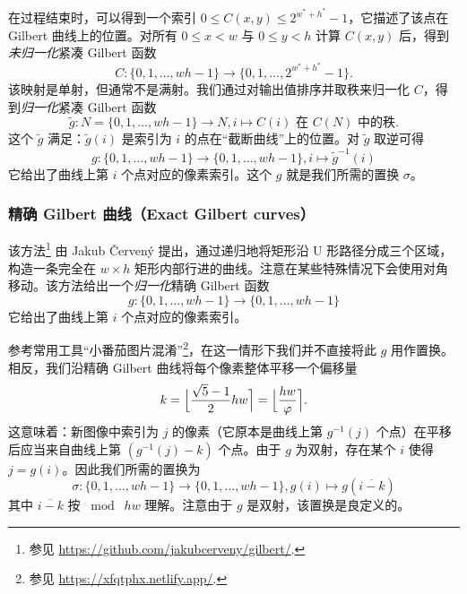 \documentclass[12pt, a4paper, twoside]{article}
\begin{document}
在过程结束时，可以得到一个索引 $0 \leq C(x, y) \leq 2^{w^* + h^*} - 1$，它描述了该点在 Gilbert 曲线上的位置。对所有 $0 \leq x < w$ 与 $0 \leq y < h$ 计算 $C(x,y)$ 后，得到\emph{未归一化}紧凑 Gilbert 函数
\begin{equation}
    C\colon \{0, 1, \ldots, w h - 1\} \to \{0, 1, \ldots, 2^{w^* + h^*} - 1\}.
\end{equation}
该映射是单射，但通常不是满射。我们通过对输出值排序并取秩来归一化 $C$，得到\emph{归一化}紧凑 Gilbert 函数
\begin{equation}
    \tilde{g}\colon N = \{0, 1, \ldots, w h - 1\} \to N, i \mapsto \text{$C(i)$ 在 $C(N)$ 中的秩}.
\end{equation}
这个 $\tilde{g}$ 满足：$\tilde{g}(i)$ 是索引为 $i$ 的点在“截断曲线”上的位置。对 $\tilde{g}$ 取逆可得
\begin{equation}
    g\colon \{0, 1, \ldots, w h - 1\} \to \{0, 1, \ldots, w h - 1\}, i \mapsto \tilde{g}^{-1}(i)
\end{equation}
它给出了曲线上第 $i$ 个点对应的像素索引。这个 $g$ 就是我们所需的置换 $\sigma$。

\subsubsection{精确 Gilbert 曲线（Exact Gilbert curves）}

该方法\footnote{参见 \url{https://github.com/jakubcerveny/gilbert/}.} 由 Jakub Červený 提出，通过递归地将矩形沿 U 形路径分成三个区域，构造一条完全在 $w \times h$ 矩形内部行进的曲线。注意在某些特殊情况下会使用对角移动。该方法给出一个\emph{归一化}精确 Gilbert 函数
\begin{equation}
    g\colon \{0, 1, \ldots, w h - 1\} \to \{0, 1, \ldots, w h - 1\}
\end{equation}
它给出了曲线上第 $i$ 个点对应的像素索引。

参考常用工具“小番茄图片混淆”\footnote{参见 \url{https://xfqtphx.netlify.app/}.}，在这一情形下我们并不直接将此 $g$ 用作置换。相反，我们沿精确 Gilbert 曲线将每个像素整体平移一个偏移量
\begin{equation}
    k = \Bigl\lfloor \frac{\sqrt{5} - 1}{2} h w \Bigr\rceil = \Bigl\lfloor \frac{h w}{\varphi} \Bigr\rceil.
\end{equation}
这意味着：新图像中索引为 $j$ 的像素（它原本是曲线上第 $g^{-1}(j)$ 个点）在平移后应当来自曲线上第 $(g^{-1}(j) - k)$ 个点。由于 $g$ 为双射，存在某个 $i$ 使得 $j = g(i)$。因此我们所需的置换为
\begin{equation}
    \sigma\colon \{0, 1, \ldots, w h - 1\} \to \{0, 1, \ldots, w h - 1\}, g(i) \mapsto g(\overline{i - k})
\end{equation}
其中 $\overline{i - k}$ 按 $\bmod \; h w$ 理解。注意由于 $g$ 是双射，该置换是良定义的。
\end{document}
